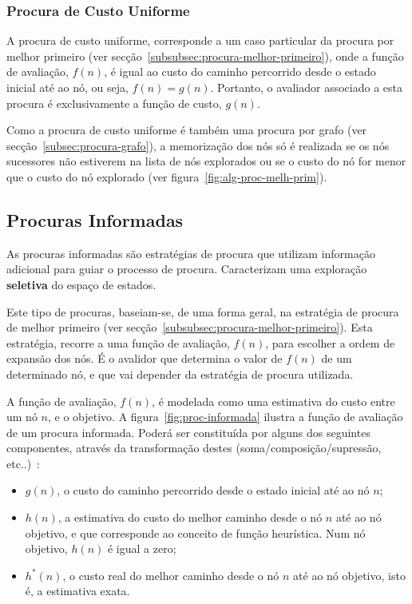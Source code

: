 \subsubsection{Procura de Custo Uniforme}\label{subsubsec:procura-custo-uniforme}

A procura de custo uniforme, corresponde a um caso particular da procura por melhor primeiro (ver secção~\ref{subsubsec:procura-melhor-primeiro}), onde a função de avaliação, $f(n)$, é igual ao custo do caminho percorrido desde o estado inicial até ao nó, ou seja, $f(n) = g(n)$. Portanto, o avaliador associado a esta procura é exclusivamente a função de custo, $g(n)$.

Como a procura de custo uniforme é também uma procura por grafo (ver secção~\ref{subsec:procura-grafo}), a memorização dos nós só é realizada se os nós sucessores não estiverem na lista de nós explorados ou se o custo do nó for menor que o custo do nó explorado (ver figura~\ref{fig:alg-proc-melh-prim}).

\subsection{Procuras Informadas}\label{subsec:procuras-informadas}

As procuras informadas são estratégias de procura que utilizam informação adicional para guiar o processo de procura.
Caracterizam uma exploração \textbf{seletiva} do espaço de estados.

Este tipo de procuras, baseiam-se, de uma forma geral, na estratégia de procura de melhor primeiro (ver secção~\ref{subsubsec:procura-melhor-primeiro}).
Esta estratégia, recorre a uma função de avaliação, $f(n)$, para escolher a ordem de expansão dos nós. É o avalidor que determina o valor de $f(n)$ de um determinado nó, e que vai depender da estratégia de procura utilizada.

A função de avaliação, $f(n)$, é modelada como uma estimativa do custo entre um nó $n$, e o objetivo.
A figura~\ref{fig:proc-informada} ilustra a função de avaliação de um procura informada.
Poderá ser constituída por alguns dos seguintes componentes, através da transformação destes (soma/composição/supressão, etc..)~\cite{ist:leic:resumos:procura-informada}:

\begin{itemize}
    \item $g(n)$, o custo do caminho percorrido desde o estado inicial até ao nó $n$;
    \item $h(n)$, a estimativa do custo do melhor caminho desde o nó $n$ até ao nó objetivo,
    e que corresponde ao conceito de função heurística.
    Num nó objetivo, $h(n)$ é igual a zero;
    \item $h^*(n)$, o custo real do melhor caminho desde o nó $n$ até ao nó objetivo, isto é, a estimativa exata.
\end{itemize}

